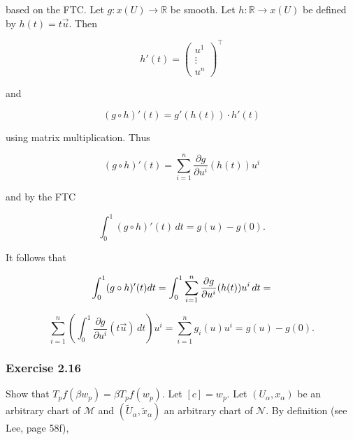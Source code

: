 \documentclass[12pt]{article}
\begin{document}
based on the FTC. Let $g:x(U)\rightarrow\mathbb{R}$ be smooth. Let
$h:\mathbb{R}\rightarrow{}x(U)$ be defined by $h(t)=t\vec{u}$. Then

\begin{equation}
  \label{eq:avaiteiz}
  h'(t)=\left(
    \begin{array}{c}
      u^{1} \\
\vdots \\
u^{n}
    \end{array}\right)^{\intercal}
\end{equation}

and 

\begin{equation}
  \label{eq:jeeyongu}
  (g\circ{}h)'(t)=g'(h(t))\cdot{}h'(t)
\end{equation}

using matrix multiplication. Thus

\begin{equation}
  \label{eq:gaichieb}
  (g\circ{}h)'(t)=\sum_{i=1}^{n}\frac{\partial{}g}{\partial{}u^{i}}(h(t))u^{i}
\end{equation}

and by the FTC

\begin{equation}
  \label{eq:yioqueep}
  \int_{0}^{1}(g\circ{}h)'(t)\,dt=g(u)-g(0).
\end{equation}

It follows that

\begin{equation}
  \label{eq:eetuwuph}
  \int_{0}^{1}(g\circ{}h)'(t)dt=\int_{0}^{1}\sum_{i=1}^{n}\frac{\partial{}g}{\partial{}u^{i}}(h(t))u^{i}\,dt=\notag
\end{equation}

\begin{equation}
  \label{eq:ahwoofom}
\sum_{i=1}^{n}\left(\int_{0}^{1}\frac{\partial{}g}{\partial{}u^{i}}(t\vec{u})\,dt\right)u^{i}=\sum_{i=1}^{n}g_{i}(u)u^{i}=g(u)-g(0).
\end{equation}

\subsubsection{Exercise 2.16}
\label{subsection:aexaiwah}

Show that $T_{p}f(\beta{}w_{p})=\beta{}T_{p}f(w_{p})$. Let
$[c]=w_{p}$. Let $(U_{\alpha},x_{\alpha})$ be an arbitrary chart of
$\mathcal{M}$ and $(\tilde{U}_{\alpha},\tilde{x}_{\alpha})$ an
arbitrary chart of $\mathcal{N}$. By definition (see Lee, page 58f),
\end{document}
